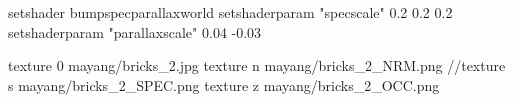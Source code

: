 setshader bumpspecparallaxworld
setshaderparam "specscale" 0.2 0.2 0.2
setshaderparam "parallaxscale" 0.04 -0.03

texture 0 mayang/bricks_2.jpg
texture n mayang/bricks_2_NRM.png
//texture s mayang/bricks_2_SPEC.png
texture z mayang/bricks_2_OCC.png

